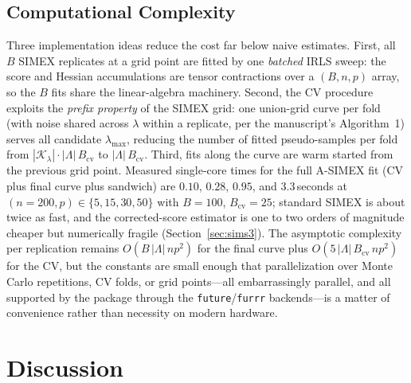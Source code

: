 \subsection{Computational Complexity}\label{sec:complexity}

Three implementation ideas reduce the cost far below naive estimates.
First, all $B$ SIMEX replicates at a grid point are fitted by one
\emph{batched} IRLS sweep: the score and Hessian accumulations are
tensor contractions over a $(B,n,p)$ array, so the $B$ fits share the
linear-algebra machinery. Second, the CV procedure exploits the
\emph{prefix property} of the SIMEX grid: one union-grid curve per
fold (with noise shared across $\lambda$ within a replicate, per the
manuscript's Algorithm~1) serves all candidate $\lambda_{\max}$,
reducing the number of fitted pseudo-samples per fold from
$|\mathcal K_\lambda|\cdot|\Lambda|\,B_{\mathrm{cv}}$ to
$|\Lambda|\,B_{\mathrm{cv}}$. Third, fits along the curve are warm
started from the previous grid point. Measured single-core times for
the full A-SIMEX fit (CV plus final curve plus sandwich) are $0.10$,
$0.28$, $0.95$, and $3.3$\,seconds at
$(n{=}200,p)\in\{5,15,30,50\}$ with $B=100$, $B_{\mathrm{cv}}=25$;
standard SIMEX is about twice as fast, and the corrected-score
estimator is one to two orders of magnitude cheaper but numerically
fragile (Section~\ref{sec:sims3}). The asymptotic complexity per
replication remains $O(B\,|\Lambda|\,n p^2)$ for the final curve plus
$O(5\,|\Lambda|\,B_{\mathrm{cv}}\,n p^2)$ for the CV, but the
constants are small enough that parallelization over Monte Carlo
repetitions, CV folds, or grid points---all embarrassingly
parallel, and all supported by the package through the
\texttt{future}/\texttt{furrr} backends---is a matter of convenience
rather than necessity on modern hardware.

\section{Discussion}\label{sec:discussion}

